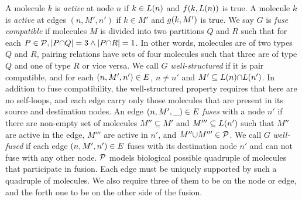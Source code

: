 



%
A molecule $k$ is {\em active} at node $n$ if $k \in L(n)$ and
$f(k,L(n))$ is true.
%
A molecule $k$ is {\em active} at edges $(n,M',n')$ if $k \in M'$ and
$g(k,M')$ is true.
%
We say $G$ is {\em fuse compatible} if molecules $M$ is divided into
two partitions $Q$ and $R$ such that
for each $P \in \mathcal{P}, |P {\cap} Q| = 3 \land |P {\cap} R| = 1 $.
%
In other words,
molecules are of two types $Q$ and $R$,
%
pairing relations have sets of four molecules such that three
are of type $Q$ and one of type $R$ or vice versa.
%
%
We call $G$ {\em well-structured} if it is pair compatible, and
for each $(n,M',n') \in E$, $n \neq n'$ and
$M' \subseteq L(n) {\cap} L(n')$.
%
In addition to fuse compatibility, the well-structured property requires that
here are no self-loops, and 
each edge carry only those molecules that are present in its source
and destination nodes.
%
An edge $(n,M',\_) \in E$ {\em fuses} with a node $n'$
if there are non-empty set of molecules $M'' \subseteq M'$ and $M''' \subseteq L(n')$
such that $M''$ are active in the edge, $M'''$ are active in $n'$, and $M'' {\cup} M''' \in \mathcal{P}$.
%
We call $G$ {\em well-fused} if each edge $(n,M',n') \in E$ fuses
with its destination node $n'$
and can not fuse with any other node.
%
$\mathcal{P}$ models biological possible quadruple of molecules that participate in fusion.
%
Each edge must be uniquely supported by such a quadruple of molecules.
%
We also require three of them to be on the node or edge, and the forth one
to be on the other side of the fusion.

